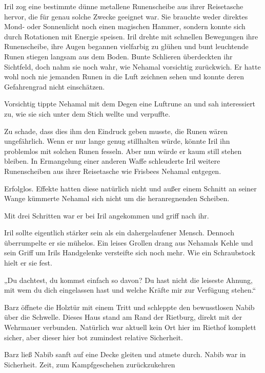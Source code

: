 Iril zog eine bestimmte dünne metallene Runenscheibe aus ihrer Reisetasche hervor, die für genau solche Zwecke geeignet war. Sie brauchte weder direktes Mond- oder Sonnenlicht noch einen magischen Hammer, sondern konnte sich durch Rotationen mit Energie speisen. Iril drehte mit schnellen Bewegungen ihre Runenscheibe, ihre Augen begannen vielfarbig zu glühen und bunt leuchtende Runen stiegen langsam aus dem Boden. Bunte Schlieren überdeckten ihr Sichtfeld, doch nahm sie noch wahr, wie Nehamal vorsichtig zurückwich. Er hatte wohl noch nie jemanden Runen in die Luft zeichnen sehen und konnte deren Gefahrengrad nicht einschätzen.

Vorsichtig tippte Nehamal mit dem Degen eine Luftrune an und sah interessiert zu, wie sie sich unter dem Stich wellte und verpuffte.

Zu schade, dass dies ihm den Eindruck geben musste, die Runen wären ungefährlich. Wenn er nur lange genug stillhalten würde, könnte Iril ihn problemlos mit solchen Runen fesseln. Aber nun würde er kaum still stehen bleiben. In Ermangelung einer anderen Waffe schleuderte Iril weitere Runenscheiben aus ihrer Reisetasche wie Frisbees Nehamal entgegen.

Erfolglos. Effekte hatten diese natürlich nicht und außer einem Schnitt an seiner Wange kümmerte Nehamal sich nicht um die heranregnenden Scheiben.

Mit drei Schritten war er bei Iril angekommen und griff nach ihr.

Iril sollte eigentlich stärker sein als ein dahergelaufener Mensch. Dennoch überrumpelte er sie mühelos. Ein leises Grollen drang aus Nehamals Kehle und sein Griff um Irils Handgelenke versteifte sich noch mehr. Wie ein Schraubstock hielt er sie fest.

„Du dachtest, du kommst einfach so davon? Du hast nicht die leiseste Ahnung, mit wem du dich eingelassen hast und welche Kräfte mir zur Verfügung stehen.“



\trennzeichen



Barz öffnete die Holztür mit einem Tritt und schleppte den bewusstlosen Nabib über die Schwelle. Dieses Haus stand am Rand der Rietburg, direkt mit der Wehrmauer verbunden. Natürlich war aktuell kein Ort hier im Riethof komplett sicher, aber dieser hier bot zumindest relative Sicherheit.

Barz ließ Nabib sanft auf eine Decke gleiten und atmete durch. Nabib war in Sicherheit. Zeit, zum Kampfgeschehen zurückzukehren

